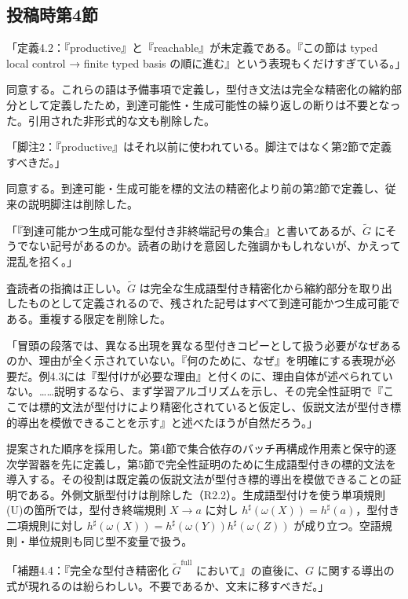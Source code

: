 
\subsection*{投稿時第4節}
「定義4.2：『productive』と『reachable』が未定義である。『この節は typed local control → finite typed basis の順に進む』という表現もくだけすぎている。」

\Reply
同意する。これらの語は予備事項で定義し，型付き文法は完全な精密化の縮約部分として定義したため，到達可能性・生成可能性の繰り返しの断りは不要となった。引用された非形式的な文も削除した。

「脚注2：『productive』はそれ以前に使われている。脚注ではなく第2節で定義すべきだ。」

\Reply
同意する。到達可能・生成可能を標的文法の精密化より前の第2節で定義し、従来の説明脚注は削除した。

「『到達可能かつ生成可能な型付き非終端記号の集合』と書いてあるが、$\widetilde G$ にそうでない記号があるのか。読者の助けを意図した強調かもしれないが、かえって混乱を招く。」

\Reply
査読者の指摘は正しい。$\widetilde G$ は完全な生成語型付き精密化から縮約部分を取り出したものとして定義されるので、残された記号はすべて到達可能かつ生成可能である。重複する限定を削除した。

「冒頭の段落では、異なる出現を異なる型付きコピーとして扱う必要がなぜあるのか、理由が全く示されていない。『何のために、なぜ』を明確にする表現が必要だ。例4.3には『型付けが必要な理由』と付くのに、理由自体が述べられていない。……説明するなら、まず学習アルゴリズムを示し、その完全性証明で『ここでは標的文法が型付けにより精密化されていると仮定し、仮説文法が型付き標的導出を模倣できることを示す』と述べたほうが自然だろう。」

\Reply
提案された順序を採用した。第4節で集合依存のバッチ再構成作用素と保守的逐次学習器を先に定義し，第5節で完全性証明のために生成語型付きの標的文法を導入する。その役割は既定義の仮説文法が型付き標的導出を模倣できることの証明である。外側文脈型付けは削除した（R2.2）。生成語型付けを使う単項規則(U)の箇所では，型付き終端規則 $X\to a$ に対し $h^\sharp(\omega(X))=h^\sharp(a)$，型付き二項規則に対し $h^\sharp(\omega(X))=h^\sharp(\omega(Y))h^\sharp(\omega(Z))$ が成り立つ。空語規則・単位規則も同じ型不変量で扱う。

「補題4.4：『完全な型付き精密化 $\widetilde G^{\mathrm{full}}$ において』の直後に、$G$ に関する導出の式が現れるのは紛らわしい。不要であるか、文末に移すべきだ。」

